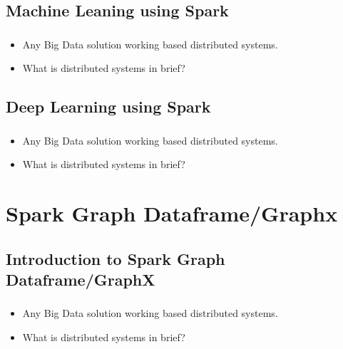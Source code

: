 \subsection{Machine Leaning using Spark }

\begin{frame}
  \frametitle{\subsecname}
	\begin{itemize}[<+->]
		\item Any Big Data solution working based distributed systems.
		\item What is distributed systems in brief?
	\end{itemize}
\end{frame}


\subsection{Deep Learning using Spark}

\begin{frame}
  \frametitle{\subsecname}
	\begin{itemize}[<+->]
		\item Any Big Data solution working based distributed systems.
		\item What is distributed systems in brief?
	\end{itemize}
\end{frame}


\section{Spark Graph Dataframe/Graphx}
\subsection{Introduction to Spark Graph Dataframe/GraphX}

\begin{frame}
  \frametitle{\subsecname}
	\begin{itemize}[<+->]
		\item Any Big Data solution working based distributed systems.
		\item What is distributed systems in brief?
	\end{itemize}
\end{frame}

